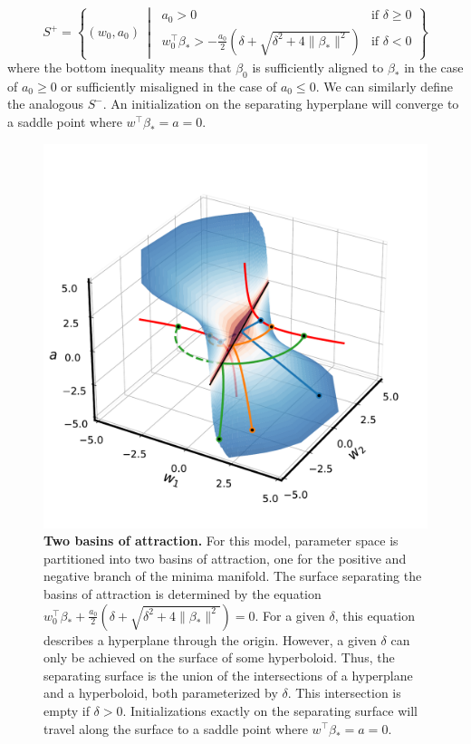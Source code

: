 \documentclass{article}
\theoremstyle{plain}
\theoremstyle{definition}
\theoremstyle{remark}
\begin{document}
\begin{equation}
    S^+ = \left\{ (w_0,a_0) \ \middle| \
    \begin{array}{ll}
        a_0 > 0 & \text{if } \delta \geq 0 \\
        w_0^\intercal \beta_* > -\frac{a_0}{2}\left(\delta + \sqrt{\delta^2 + 4\|\beta_*\|^2}\right) & \text{if } \delta < 0
    \end{array}
    \right\}
\end{equation}
where the bottom inequality means that $\beta_0$ is sufficiently aligned to $\beta_*$ in the case of $a_0 \geq 0$ or sufficiently misaligned in the case of $a_0 \leq 0$. We can similarly define the analogous $S^-$. An initialization on the separating hyperplane will converge to a saddle point where $w^\intercal\beta_* = a = 0$.


\begin{figure}[H]
    \centering
    \includegraphics[width=0.5\linewidth]{fig/single-neuron/seperating-surface.pdf}
    \caption{\textbf{Two basins of attraction.}
    For this model, parameter space is partitioned into two basins of attraction, one for the positive and negative branch of the minima manifold.
    The surface separating the basins of attraction is determined by the equation $w_0^\intercal \beta_* + \frac{a_0}{2} \left(\delta + \sqrt{\delta^2 + 4 \|\beta_*\|^2}\right) = 0$.
    For a given $\delta$, this equation describes a hyperplane through the origin.
    However, a given $\delta$ can only be achieved on the surface of some hyperboloid.
    Thus, the separating surface is the union of the intersections of a hyperplane and a hyperboloid, both parameterized by $\delta$.
    This intersection is empty if $\delta > 0$.
    Initializations exactly on the separating surface will travel along the surface to a saddle point where $w^\intercal \beta_* = a = 0$.
    }
    \label{fig:single-neuron-basins}
\end{figure}
\end{document}
